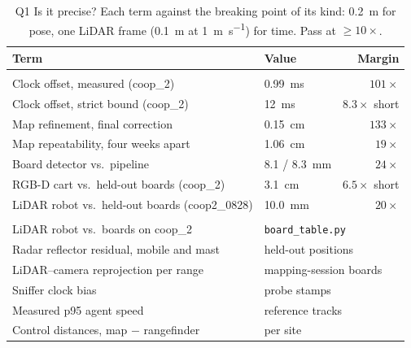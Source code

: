 \begin{table}[t]
\centering
\caption{Q1 Is it precise? Each term against the breaking point of its
kind: \SI{0.2}{\metre} for pose, one LiDAR frame (\SI{0.1}{\metre} at
\SI{1}{\metre\per\second}) for time. Pass at $\geq 10\times$.}
\label{tab:res_q1}
\footnotesize
\setlength{\tabcolsep}{3pt}
\begin{tabularx}{\columnwidth}{@{}>{\raggedright\arraybackslash}X l r@{}}
\toprule
Term & Value & Margin \\
\midrule
\multicolumn{3}{@{}l}{\emph{Answered}} \\
Clock offset, measured (coop\_2) & \SI{0.99}{\milli\second} & $101\times$ \\
Clock offset, strict bound (coop\_2) & \SI{12}{\milli\second} & $8.3\times$ short \\
Map refinement, final correction & \SI{0.15}{\centi\metre} & $133\times$ \\
Map repeatability, four weeks apart & \SI{1.06}{\centi\metre} & $19\times$ \\
Board detector vs.\ pipeline & \SI{8.1}{} / \SI{8.3}{\milli\metre} & $24\times$ \\
RGB-D cart vs.\ held-out boards (coop\_2) & \SI{3.1}{\centi\metre} & $6.5\times$ short \\
LiDAR robot vs.\ held-out boards (coop2\_0828) & \SI{10.0}{\milli\metre} & $20\times$ \\
\midrule
\multicolumn{3}{@{}l}{\emph{Still needed}} \\
LiDAR robot vs.\ boards on coop\_2 & \multicolumn{2}{l}{\texttt{board\_table.py}} \\
Radar reflector residual, mobile and mast & \multicolumn{2}{l}{held-out positions} \\
LiDAR--camera reprojection per range & \multicolumn{2}{l}{mapping-session boards} \\
Sniffer clock bias & \multicolumn{2}{l}{probe stamps} \\
Measured p95 agent speed & \multicolumn{2}{l}{reference tracks} \\
Control distances, map $-$ rangefinder & \multicolumn{2}{l}{per site} \\
\bottomrule
\end{tabularx}
\end{table}
